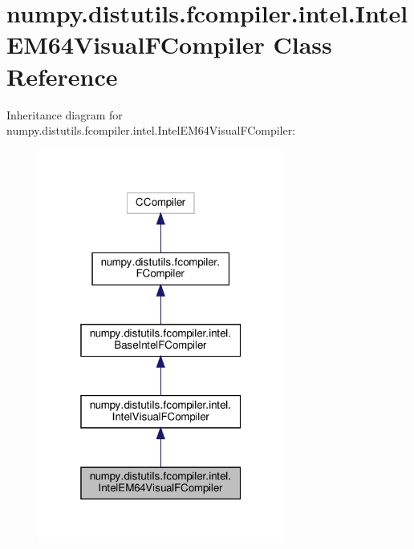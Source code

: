 \hypertarget{classnumpy_1_1distutils_1_1fcompiler_1_1intel_1_1IntelEM64VisualFCompiler}{}\section{numpy.\+distutils.\+fcompiler.\+intel.\+Intel\+E\+M64\+Visual\+F\+Compiler Class Reference}
\label{classnumpy_1_1distutils_1_1fcompiler_1_1intel_1_1IntelEM64VisualFCompiler}


Inheritance diagram for numpy.\+distutils.\+fcompiler.\+intel.\+Intel\+E\+M64\+Visual\+F\+Compiler\+:
\nopagebreak
\begin{figure}[H]
\begin{center}
\leavevmode
\includegraphics[width=229pt]{classnumpy_1_1distutils_1_1fcompiler_1_1intel_1_1IntelEM64VisualFCompiler__inherit__graph}
\end{center}
\end{figure}


